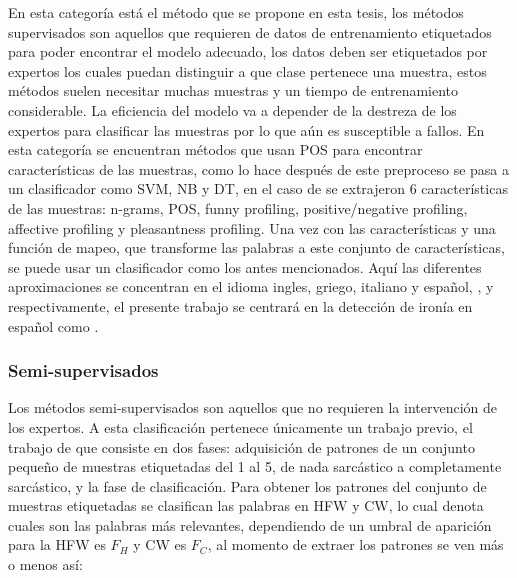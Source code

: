 		\par En esta categoría está el método que se propone en esta tesis, los métodos supervisados son aquellos que requieren de datos de entrenamiento etiquetados para poder encontrar el modelo adecuado, los datos deben ser etiquetados por expertos los cuales puedan distinguir a que clase pertenece una muestra, estos métodos suelen necesitar muchas muestras y un tiempo de entrenamiento considerable. La eficiencia del modelo va a depender de la destreza de los expertos para clasificar las muestras por lo que aún es susceptible a fallos. En esta categoría se encuentran métodos que usan \gls{POS} para encontrar características de las muestras, como lo hace \cite{reyes2012making} después de este preproceso se pasa a un clasificador como \gls{SVM}, \gls{NB} y \gls{DT}, en el caso de \cite{reyes2012making} se extrajeron 6 características de las muestras: \gls{n-grams}, \gls{POS}, funny profiling, positive/negative profiling, affective profiling y pleasantness profiling. Una vez con las características y una función de mapeo, %
		que transforme las palabras a este conjunto de características, se puede usar un clasificador como los antes mencionados.
		Aquí las diferentes aproximaciones se concentran en el idioma ingles, griego, italiano y español, \cite{charalampakis2015detecting}, \cite{barbieri2014italian} y \cite{lopez2016character} respectivamente, el presente trabajo se centrará en la detección de ironía en español como \cite{lopez2016character}.
		
		\subsubsection{Semi-supervisados}
		
		\par Los métodos semi-supervisados son aquellos que no requieren la intervención de los expertos. A esta clasificación pertenece únicamente un trabajo previo, el trabajo de \cite{davidov2010semi} que consiste en dos fases: adquisición de patrones de un conjunto pequeño de muestras etiquetadas del 1 al 5, de nada sarcástico a completamente sarcástico,  y la fase de clasificación. Para obtener los patrones del conjunto de muestras etiquetadas se clasifican las palabras en \gls{HFW} y \gls{CW}, lo cual denota cuales son las palabras más relevantes, dependiendo de un umbral de aparición para la \gls{HFW} es $F_H$ y \gls{CW} es $F_C$, al momento de extraer los patrones se ven más o menos así:
		
